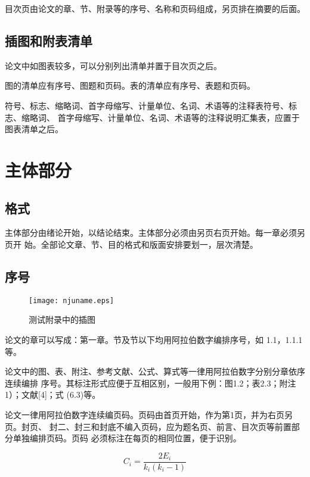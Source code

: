 \documentclass[master]{njuthesis}
\begin{document}
\begin{enumerate}
\begin{enumerate}
\begin{enumerate}
\begin{enumerate}
目次页由论文的章、节、附录等的序号、名称和页码组成，另页排在摘要的后面。

\subsection{插图和附表清单}

论文中如图表较多，可以分别列出清单并置于目次页之后。

图的清单应有序号、图题和页码。表的清单应有序号、表题和页码。

符号、标志、缩略词、首字母缩写、计量单位、名词、术语等的注释表符号、标志、缩略词、
首字母缩写、计量单位、名词、术语等的注释说明汇集表，应置于图表清单之后。

\section{主体部分}

\subsection{格式}

主体部分由绪论开始，以结论结束。主体部分必须由另页右页开始。每一章必须另页开
始。全部论文章、节、目的格式和版面安排要划一，层次清楚。

\subsection{序号}

\begin{figure}[htbp]
  \centering
  \texttt{[image: njuname.eps]}\\
  \caption{测试附录中的插图}\label{fig:appendix1}
\end{figure}

论文的章可以写成：第一章。节及节以下均用阿拉伯数字编排序号，如
1.1，1.1.1等。

论文中的图、表、附注、参考文献、公式、算式等一律用阿拉伯数字分别分章依序连续编排
序号。其标注形式应便于互相区别，一般用下例：图1.2；表2.3；附注1）；文献[4]；式
  (6.3)等。

论文一律用阿拉伯数字连续编页码。页码由首页开始，作为第1页，并为右页另页。封页、
封二、封三和封底不编入页码，应为题名页、前言、目次页等前置部分单独编排页码。页码
必须标注在每页的相同位置，便于识别。

\begin{equation}
    C_i = \frac{2E_i}{k_i(k_i-1)}
\end{equation}


\end{enumerate}
\end{enumerate}
\end{enumerate}
\end{enumerate}
\end{document}
